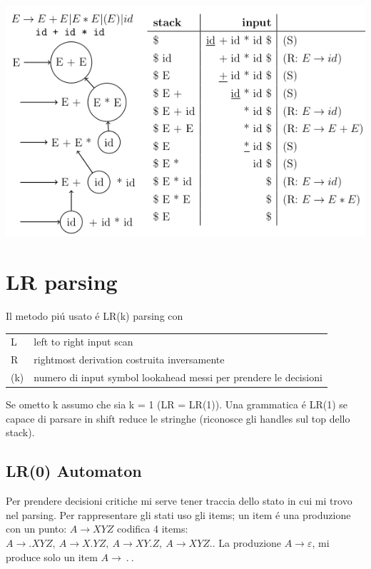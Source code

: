 \begin{center}
    \includegraphics[scale=0.6]{Chapters/Img/c04_05.png}\\
\end{center}

\section{LR parsing}
Il metodo pi\'u usato \'e LR(k) parsing con 
\begin{tabular}{ll}
    L   &   left to right input scan\\
    R   &   rightmost derivation costruita inversamente\\
    (k) &   numero di input symbol lookahead messi per prendere le decisioni\\
\end{tabular}

Se ometto k assumo che sia k = 1 (LR = LR(1)). Una grammatica \'e LR(1) se capace di parsare in shift reduce le stringhe (riconosce gli 
handles sul top dello stack).

\subsection{LR(0) Automaton}
Per prendere decisioni critiche mi serve tener traccia dello stato in cui mi trovo nel parsing. Per rappresentare gli stati uso gli items;
un item \'e una produzione con un punto: $A \rightarrow XYZ$ codifica 4 items: 
$A \rightarrow .XYZ,\ A \rightarrow X.YZ,\ A \rightarrow XY.Z,\ A \rightarrow XYZ.$.
La produzione $A \rightarrow \varepsilon$, mi produce solo un item $A \rightarrow\ .\ $. \\


